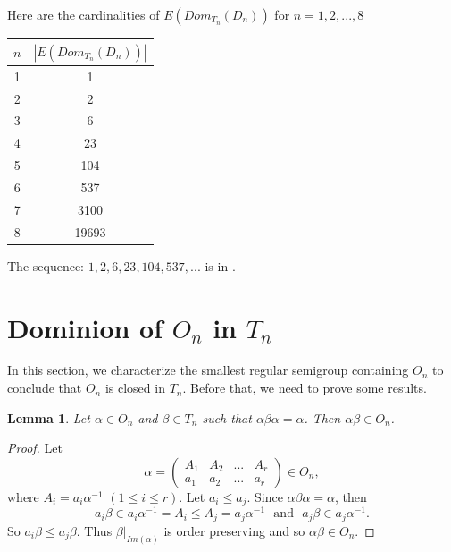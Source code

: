 \documentclass[10pt]{extarticle}
\numberwithin{equation}{section}
\numberwithin{bbb}{section}
\newtheorem{lemma}{Lemma}[section]
\numberwithin{equation}{section}
\begin{document}
Here are the cardinalities of $E(Dom_{T_n}(D_n))$ for $n=1,2,...,8$

\vspace{0.5cm}
\begin{center}
    \begin{tabular}{|c|c|}
    \hline
    $n$  & $|E(Dom_{T_n}(D_n))|$ \\
    \hline
    1  & 1 \\
        \hline
       2  & 2 \\
       \hline
       3  & 6 \\
        \hline
       4  & 23 \\
        \hline
       5  & 104  \\
        \hline
       6  &  537\\
        \hline
       7  &  3100\\
        \hline
        8 & 19693\\
        \hline
    \end{tabular}
\end{center}
\vspace{0.5cm}
The sequence: $1,2,6,23,104,537,...$ is in \cite{seq}.

\section{Dominion of $O_n$ in $T_n$}
\vspace{0.6cm}
In this section, we characterize the smallest regular semigroup containing $O_n$ to conclude that $O_n$ is closed in $T_n$. Before that, we need to prove some results.

\vspace{0.5cm}
\begin{lemma}
     Let $\alpha \in O_n$ and $\beta \in T_n$ such that $\alpha \beta \alpha=\alpha$. Then $\alpha \beta \in O_n$. 
    \end{lemma}
    
     \begin{proof}
Let
$$\alpha=
\begin{pmatrix} A_1&A_2&...&A_r\\a_1&a_2&...&a_r
\end{pmatrix} \in O_n ,$$
where $A_i=a_i\alpha^{-1}$ $(1\le i \le r)$. Let $a_i \le a_j$. Since $\alpha \beta \alpha=\alpha$, then 
$$a_i\beta \in a_i \alpha^{-1}=A_i \le A_j=a_j\alpha^{-1} \ \ \ \text{and} \ \ \  a_j\beta \in a_j\alpha^{-1}.$$
So $a_i\beta \le a_j\beta$.
Thus $\beta|_{Im(\alpha)}$ is order preserving and so $\alpha\beta \in O_n.$ 
\end{proof}
\end{document}
